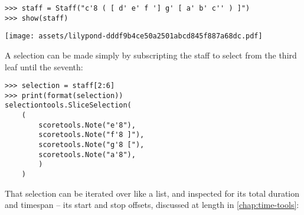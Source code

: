 \begin{comment}
<abjad>
staff = Staff("c'8 ( [ d' e' f '] g' [ a' b' c'' ) ]")
show(staff)
</abjad>
\end{comment}

\begin{abjadbookoutput}
\begin{singlespacing}
\vspace{-0.5\baselineskip}
\begin{lstlisting}
>>> staff = Staff("c'8 ( [ d' e' f '] g' [ a' b' c'' ) ]")
>>> show(staff)
\end{lstlisting}
\noindent\texttt{[image: assets/lilypond-dddf9b4ce50a2501abcd845f887a68dc.pdf]}
\end{singlespacing}
\end{abjadbookoutput}

\noindent A selection can be made simply by subscripting the staff to select
from the third leaf until the seventh:

\begin{comment}
<abjad>
selection = staff[2:6]
print(format(selection))
</abjad>
\end{comment}

\begin{abjadbookoutput}
\begin{singlespacing}
\vspace{-0.5\baselineskip}
\begin{lstlisting}
>>> selection = staff[2:6]
>>> print(format(selection))
selectiontools.SliceSelection(
    (
        scoretools.Note("e'8"),
        scoretools.Note("f'8 ]"),
        scoretools.Note("g'8 ["),
        scoretools.Note("a'8"),
        )
    )
\end{lstlisting}
\end{singlespacing}
\end{abjadbookoutput}

\noindent That selection can be iterated over like a list, and inspected for
its total duration and timespan -- its start and stop offsets, discussed at
length in \autoref{chap:time-tools}:

\begin{comment}
<abjad>
for component in selection:
    component

selection.get_duration()
selection.get_timespan()
</abjad>
\end{comment}

